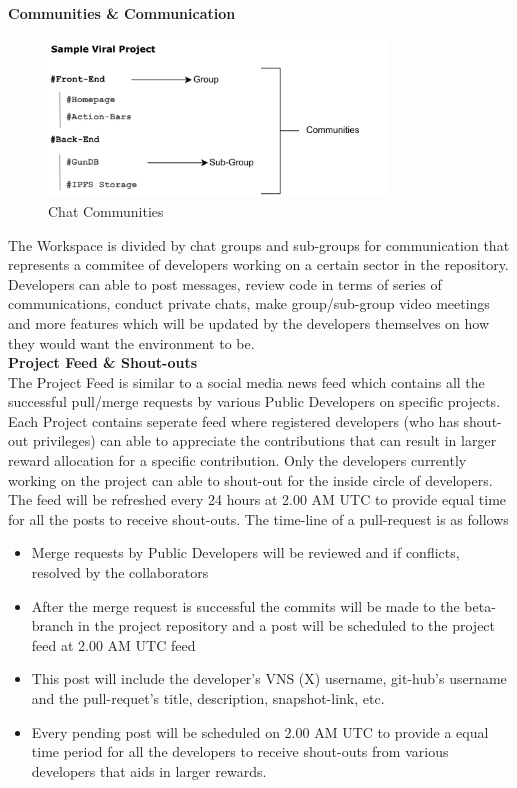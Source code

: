 \documentclass[letterpaper,11pt]{article}
\begin{document}
\textbf{Communities \& Communication}\\

\begin{figure}[H]
\begin{center}
\includegraphics[width=9cm]{chat-community}
\caption{Chat Communities}
\end{center}
\end{figure}

The Workspace is divided by chat groups and sub-groups for communication that represents a commitee of developers working on a certain sector in the repository. Developers can able to post messages, review code in terms of series of communications, conduct private chats, make group/sub-group video meetings and more features which will be updated by the developers themselves on how they would want the environment to be.\\

\textbf{Project Feed \& Shout-outs}\\

The Project Feed is similar to a social media news feed which contains all the successful pull/merge requests by various Public Developers on specific projects. Each Project contains seperate feed where registered developers (who has shout-out privileges) can able to appreciate the contributions that can result in larger reward allocation for a specific contribution. Only the developers currently working on the project can able to shout-out for the inside circle of developers. The feed will be refreshed every 24 hours at 2.00 AM UTC to provide equal time for all the posts to receive shout-outs. The time-line of a pull-request is as follows
\begin{itemize}[wide, labelwidth=!, labelindent=0pt]
\item Merge requests by Public Developers will be reviewed and if conflicts, resolved by the collaborators
\item After the merge request is successful the commits will be made to the beta-branch in the project repository and a post will be scheduled to the project feed at 2.00 AM UTC feed
\item This post will include the developer's VNS (X) username, git-hub's username and the pull-requet's title, description, snapshot-link, etc.
\item Every pending post will be scheduled on 2.00 AM UTC to provide a equal time period for all the developers to  receive shout-outs from various developers that aids in larger rewards. 
\end{itemize}
\end{document}
